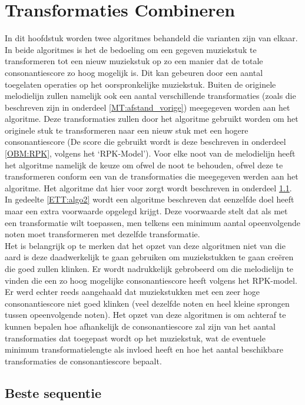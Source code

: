 \chapter{Transformaties Combineren}
\label{hoofdstuk:ETT}

In dit hoofdstuk worden twee algoritmes behandeld die varianten zijn van elkaar. In beide algoritmes is het de bedoeling om een gegeven muziekstuk te transformeren tot een nieuw muziekstuk op zo een manier dat de totale consonantiescore zo hoog mogelijk is. Dit kan gebeuren door een aantal toegelaten operaties op het oorspronkelijke muziekstuk. Buiten de originele melodielijn zullen namelijk ook een aantal verschillende transformaties (zoals die beschreven zijn in onderdeel \ref{MT:afstand_vorige}) meegegeven worden aan het algoritme. Deze transformaties zullen door het algoritme gebruikt worden om het originele stuk te transformeren naar een nieuw stuk met een hogere consonantiescore (De score die gebruikt wordt is deze beschreven in onderdeel \ref{OBM:RPK}, volgens het `RPK-Model'). Voor elke noot van de melodielijn heeft het algoritme namelijk de keuze om ofwel de noot te behouden, ofwel deze te transformeren conform een van de transformaties die meegegeven werden aan het algoritme. Het algoritme dat hier voor zorgt wordt beschreven in onderdeel \ref{ETT:algo1}. In gedeelte \ref{ETT:algo2} wordt een algoritme beschreven dat eenzelfde doel heeft maar een extra voorwaarde opgelegd krijgt. Deze voorwaarde stelt dat als met een transformatie wilt toepassen, men telkens een minimum aantal opeenvolgende noten moet transformeren met dezelfde transformatie. \\
Het is belangrijk op te merken dat het opzet van deze algoritmen niet van die aard is deze daadwerkelijk te gaan gebruiken om muziekstukken te gaan cre\"eren die goed zullen klinken. Er wordt nadrukkelijk gebrobeerd om die melodielijn te vinden die een zo hoog mogelijke consonantiescore heeft volgens het RPK-model. Er werd echter reeds aangehaald dat muziekstukken met een zeer hoge consonantiescore niet goed klinken (veel dezelfde noten en heel kleine sprongen tussen opeenvolgende noten). Het opzet van deze algoritmen is om achteraf te kunnen bepalen hoe afhankelijk de consonantiescore zal zijn van het aantal transformaties dat toegepast wordt op het muziekstuk, wat de eventuele minimum transformatielengte als invloed heeft en hoe het aantal beschikbare transformaties de consonantiescore bepaalt.

\section{Beste sequentie}
\label{ETT:algo1}

